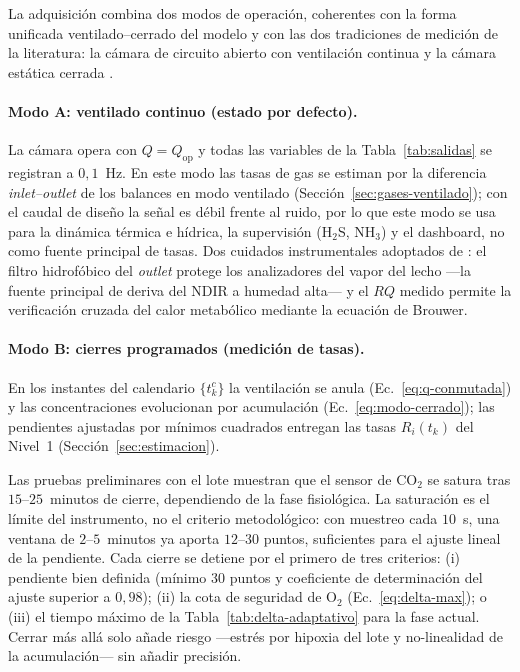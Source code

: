 La adquisición combina dos modos de operación, coherentes con la forma
unificada ventilado--cerrado del modelo y con las dos tradiciones de medición
de la literatura: la cámara de circuito abierto con ventilación continua
\citep{parodiBioconversionEfficienciesGreenhouse2020a} y la cámara estática
cerrada \citep{ermolaevGreenhouseGasEmissions2019}.

\paragraph{Modo A: ventilado continuo (estado por defecto).}
La cámara opera con $Q = Q_{\mathrm{op}}$ y todas las variables de la
Tabla~\ref{tab:salidas} se registran a $0{,}1$~Hz. En este modo las tasas de
gas se estiman por la diferencia \emph{inlet--outlet} de los balances en modo
ventilado (Sección~\ref{sec:gases-ventilado}); con el caudal de diseño la
señal es débil frente al ruido, por lo que este modo se usa para la dinámica
térmica e hídrica, la supervisión (H$_2$S, NH$_3$) y el dashboard, no como
fuente principal de tasas. Dos cuidados instrumentales adoptados de
\citet{parodiBioconversionEfficienciesGreenhouse2020a}: el filtro hidrofóbico
del \emph{outlet} protege los analizadores del vapor del lecho ---la fuente
principal de deriva del NDIR a humedad alta--- y el $RQ$ medido permite la
verificación cruzada del calor metabólico mediante la ecuación de Brouwer.

\paragraph{Modo B: cierres programados (medición de tasas).}
En los instantes del calendario $\{t_k^c\}$ la ventilación se anula
(Ec.~\eqref{eq:q-conmutada}) y las concentraciones evolucionan por
acumulación (Ec.~\eqref{eq:modo-cerrado}); las pendientes ajustadas por
mínimos cuadrados entregan las tasas $R_i(t_k)$ del Nivel~1
(Sección~\ref{sec:estimacion}).

\begin{remark}\label{rem:no-saturacion}
Las pruebas preliminares con el lote muestran que el sensor de CO$_2$ se
satura tras $15$--$25$~minutos de cierre, dependiendo de la fase fisiológica.
La saturación es el límite del instrumento, no el criterio metodológico: con
muestreo cada $10$~s, una ventana de $2$--$5$~minutos ya aporta $12$--$30$
puntos, suficientes para el ajuste lineal de la pendiente. Cada cierre se
detiene por el primero de tres criterios: (i) pendiente bien definida
(mínimo $30$ puntos y coeficiente de determinación del ajuste superior a
$0{,}98$); (ii) la cota de seguridad de O$_2$ (Ec.~\eqref{eq:delta-max}); o
(iii) el tiempo máximo de la Tabla~\ref{tab:delta-adaptativo} para la fase
actual. Cerrar más allá solo añade riesgo ---estrés por hipoxia del lote y
no-linealidad de la acumulación--- sin añadir precisión.
\end{remark}

